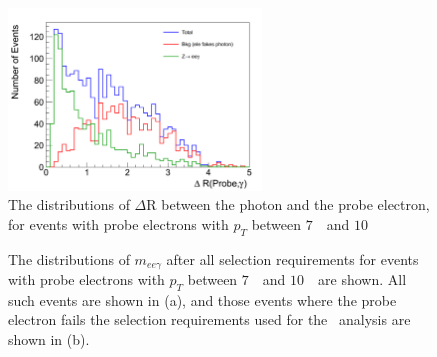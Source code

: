 \documentclass{cmspaper}
\begin{document}
\begin{figure}[htb]
  \begin{center}
    \includegraphics[width=0.6\textwidth]{figures/DeltaRProbePhoton_AfterPhotonSelection.pdf}
    \caption{The distributions of $\Delta$R between the photon and the probe electron,
      for events with probe electrons with $p_{T}$ between $7$~\GeV\ and $10$~\GeV
    }
    \label{fig:DeltaRProbePhoton}
  \end{center}
\end{figure}

\begin{figure}[htb]
  \begin{center}
    \caption{The distributions of $m_{ee\gamma}$ after all selection requirements
      for events with probe electrons with $p_{T}$ between $7$~\GeV\ and $10$~\GeV\  are shown. 
      All such events are shown in (a), and those events where the probe electron fails the 
      selection requirements used for the \HiggsToZZ\ analysis are shown in (b). 
    }
    \label{fig:MassEEGamma_AfterAllSelection}
  \end{center}
\end{figure}
\end{document}
